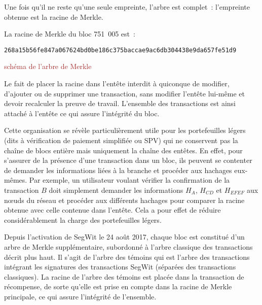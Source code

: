 Une fois qu'il ne reste qu'une seule empreinte, l'arbre est complet~: l'empreinte obtenue est la racine de Merkle.

La racine de Merkle du bloc 751~005 est~:

\begin{Verbatim}[fontsize=\footnotesize]
268a15b56fe847a067624bd0be186c375baccae9ac6db304438e9da657fe51d9
\end{Verbatim}

\textcolor{brown}{schéma de l'arbre de Merkle} %

Le fait de placer la racine dans l'entête interdit à quiconque de modifier, d'ajouter ou de supprimer une transaction, sans modifier l'entête lui-même et devoir recalculer la preuve de travail. L'ensemble des transactions est ainsi attaché à l'entête ce qui assure l'intégrité du bloc.

Cette organisation se révèle particulièrement utile pour les portefeuilles légers (dits à vérification de paiement simplifiée ou SPV) qui ne conservent pas la chaîne de blocs entière mais uniquement la chaîne des entêtes. En effet, pour s'assurer de la présence d'une transaction dans un bloc, ils peuvent se contenter de demander les informations liées à la branche et procéder aux hachages eux-mêmes. Par exemple, un utilisateur voulant vérifier la confirmation de la transaction $B$ doit simplement demander les informations $H_A$, $H_{CD}$ et $H_{EFEF}$ aux nœuds du réseau et procéder aux différents hachages pour comparer la racine obtenue avec celle contenue dans l'entête. Cela a pour effet de réduire considérablement la charge des portefeuilles légers.

Depuis l'activation de SegWit le 24 août 2017, chaque bloc est constitué d'un arbre de Merkle supplémentaire, subordonné à l'arbre classique des transactions décrit plus haut. Il s'agit de l'arbre des témoins qui est l'arbre des transactions intégrant les signatures des transactions SegWit (séparées des transactions classiques). La racine de l'arbre des témoins est placée dans la transaction de récompense, de sorte qu'elle est prise en compte dans la racine de Merkle principale, ce qui assure l'intégrité de l'ensemble.

